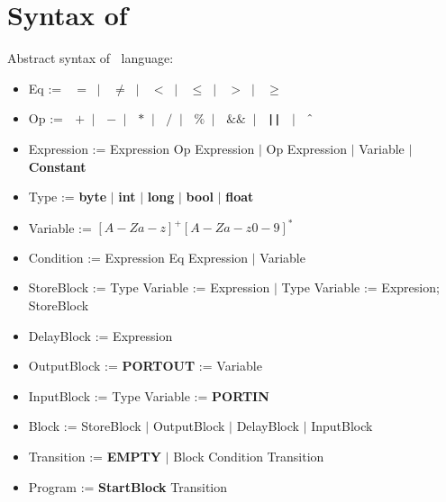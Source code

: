\clearpage
\section{Syntax of \plcchart}
\label{sec:statechartsyn}

Abstract syntax of \plcchart $\:$ language:
\begin{definition}
\plcchart

\begin{itemize}
	\item Eq := $\;$ \boldmath$=$\unboldmath $\; \mid \;$ \boldmath$\neq$\unboldmath $\; \mid \;$ \boldmath$<$\unboldmath $\; \mid \;$ \boldmath$\leq$\unboldmath $\; \mid \;$ \boldmath$>$\unboldmath $\; \mid \;$ \boldmath$\geq$\unboldmath	
	\item Op := $\;$ \boldmath$+$\unboldmath $\; \mid \;$ \boldmath$-$\unboldmath $\; \mid \;$ \boldmath$*$\unboldmath $\; \mid \;$ \boldmath$/$\unboldmath $\; \mid \;$ \boldmath$\%$\unboldmath $\; \mid \;$ \boldmath$\&\&$\unboldmath $\; \mid \;$ \textbf{\texttt{||}} $\; \mid \;$ \boldmath$\mathbin{\char`\^}$\unboldmath

	\item Expression := Expression Op Expression $\mid$ Op Expression $\mid$ Variable $\mid$ \textbf{Constant}
	
	\item Type := \textbf{byte} $\mid$ \textbf{int} $\mid$ \textbf{long} $\mid$ \textbf{bool} $\mid$ \textbf{float}
	\item Variable := $[A-Za-z]^+[A-Za-z0-9]^*$

	\item Condition := Expression Eq Expression $\mid$ Variable

		
	\item StoreBlock := Type Variable := Expression $\mid$ Type Variable := Expresion; StoreBlock
	\item DelayBlock := Expression
	\item OutputBlock := \textbf{PORTOUT} := Variable
	\item InputBlock := Type Variable := \textbf{PORTIN}
	\item Block := StoreBlock $\mid$ OutputBlock $\mid$ DelayBlock $\mid$ InputBlock

	
	\item Transition := \textbf{EMPTY} $\mid$ Block Condition Transition
	
	\item Program := \textbf{StartBlock} Transition
\end{itemize}
\end{definition}

